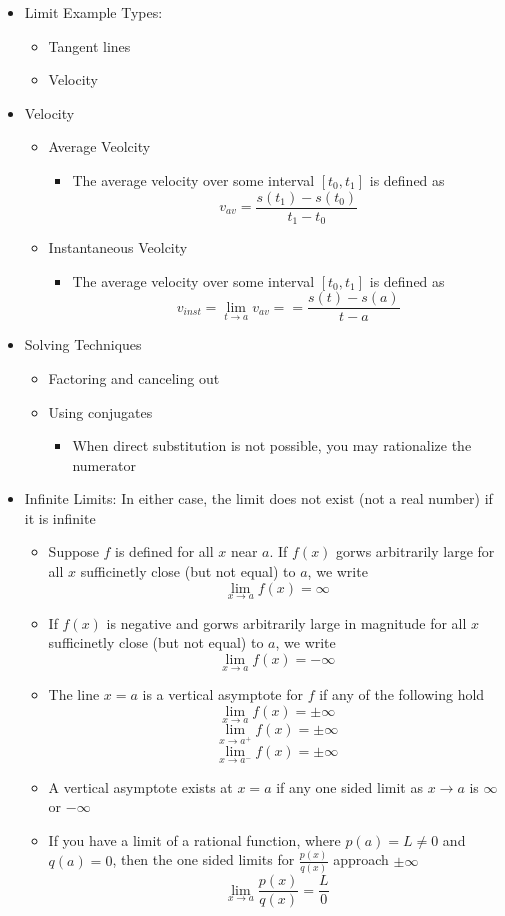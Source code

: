 \documentclass{article}
\begin{document}
\begin{itemize}
    \item Limit Example Types:
        \begin{itemize}
            \item Tangent lines
            \item Velocity
        \end{itemize}
    \item Velocity
        \begin{itemize}
            \item Average Veolcity
            \begin{itemize}
                \item The average velocity over some interval $[t_0, t_1]$ is defined as
                $$v_{av} = \frac{s(t_1) - s(t_0)}{t_1 - t_0}$$
            \end{itemize}
            \item Instantaneous Veolcity
            \begin{itemize}
                \item The average velocity over some interval $[t_0, t_1]$ is defined as
                $$v_{inst} = \lim_{t \to a}{v_{av}} = = \frac{s(t) - s(a)}{t - a}$$
            \end{itemize}
        \end{itemize}
    \item Solving Techniques
        \begin{itemize}
    	    \item Factoring and canceling out
    	    \item Using conjugates
            \begin{itemize}
    	    	\item When direct substitution is not possible, you may rationalize the numerator
            \end{itemize}
        \end{itemize}
	\item Infinite Limits: In either case, the limit does not exist (not a real number) if it is infinite
	\begin{itemize}
		\item Suppose $f$ is defined for all $x$ near $a$. If $f(x)$ gorws arbitrarily large for all $x$ sufficinetly close (but not equal) to $a$, we write
		$$\lim_{x \to a}{f(x)} = \infty$$
		\item If $f(x)$ is negative and gorws arbitrarily large in magnitude for all $x$ sufficinetly close (but not equal) to $a$, we write
		$$\lim_{x \to a}{f(x)} = - \infty$$
		\item The line $x = a$ is a vertical asymptote for $f$ if any of the following hold
		$$\lim_{x \to a}{f(x)} = \pm \infty$$
		$$\lim_{x \to a^+}{f(x)} = \pm \infty$$
		$$\lim_{x \to a^-}{f(x)} = \pm \infty$$
		\item A vertical asymptote exists at $x = a$ if any one sided limit as $x \to a$ is $\infty$ or $- \infty$
		\item If you have a limit of a rational function, where $p(a) = L \neq 0$ and $q(a) = 0$, then the one sided limits for $\frac{p(x)}{q(x)}$ approach $\pm \infty$
		$$\lim_{x \to a}{\frac{p(x)}{q(x)}} = \frac{L}{0}$$
	\end{itemize}
\end{itemize}
\end{document}

